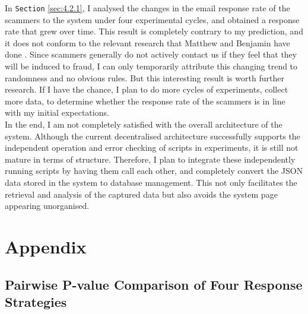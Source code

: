 \documentclass[ oneside,%
                    author={Cassie Qing Tang},
                    degree={BSc},
                     title={An Automated Response System for Disrupting Online Pet Scamming \\ },
                    subtitle={ }]{dissertation}
\begin{document}
In \texttt{Section} \ref{sec:4.2.1}, I analysed the changes in the email response rate of the scammers to the system under four experimental cycles, and obtained a response rate that grew over time. This result is completely contrary to my prediction, and it does not conform to the relevant research that Matthew and Benjamin have done \cite{price_resource_2020}. Since scammers generally do not actively contact us if they feel that they will be induced to fraud, I can only temporarily attribute this changing trend to randomness and no obvious rules. But this interesting result is worth further research. If I have the chance, I plan to do more cycles of experiments, collect more data, to determine whether the response rate of the scammers is in line with my initial expectations.
\\

In the end, I am not completely satisfied with the overall architecture of the system. Although the current decentralised architecture successfully supports the independent operation and error checking of scripts in experiments, it is still not mature in terms of structure. Therefore, I plan to integrate these independently running scripts by having them call each other, and completely convert the JSON data stored in the system to database management. This not only facilitates the retrieval and analysis of the captured data but also avoids the system page appearing unorganised.

% 


\appendix

\chapter{Appendix}
\section{Pairwise P-value Comparison of Four Response Strategies}
\label{appendix}
\end{document}
